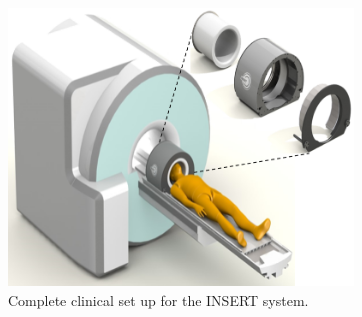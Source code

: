 \begin{figure}[!t]
\centering
\includegraphics[width=3.6in]{figures/INSERT_clinical.png}

\caption{Complete clinical set up for the \acrshort{INSERT} system.}
\label{fig_INSERT}
\end{figure}
